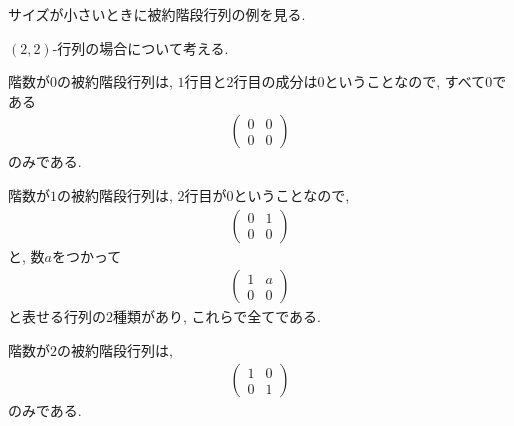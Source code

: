 サイズが小さいときに被約階段行列の例を見る.
\begin{example}
  $(2,2)$-行列の場合について考える.
  
  階数が$0$の被約階段行列は,
  $1$行目と$2$行目の成分は$0$ということなので, すべて$0$である
  \begin{align*}
    \begin{pmatrix}
      0&0\\0&0
    \end{pmatrix}
  \end{align*}
  のみである.

  階数が$1$の被約階段行列は,
  $2$行目が$0$ということなので,
  \begin{align*}
    \begin{pmatrix}
      0&1\\0&0
    \end{pmatrix}
  \end{align*}
  と, 数$a$をつかって
  \begin{align*}
    \begin{pmatrix}
      1&a\\0&0
    \end{pmatrix}
  \end{align*}
  と表せる行列の$2$種類があり,
  これらで全てである.

  階数が$2$の被約階段行列は,
  \begin{align*}
    \begin{pmatrix}
      1&0\\0&1
    \end{pmatrix}
  \end{align*}
  のみである.

  
\end{example}
